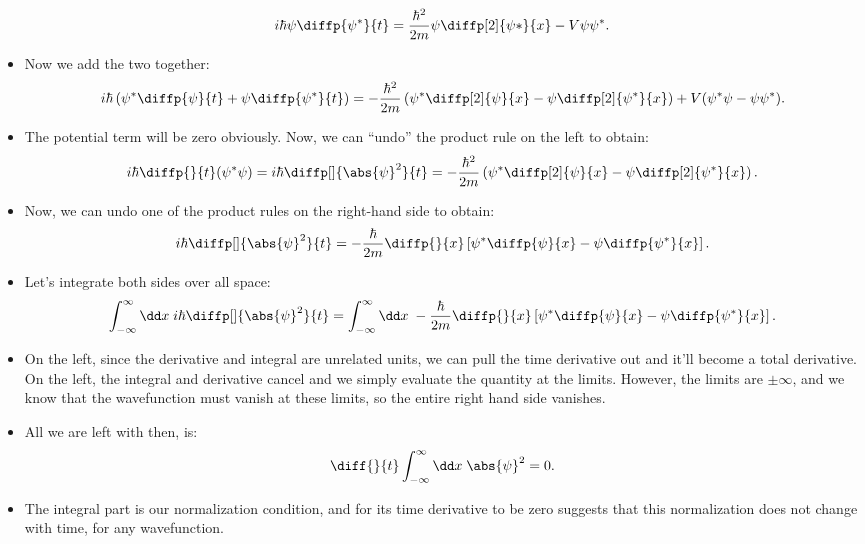 \begin{itemize}
\begin{equation}
            i\hbar \psi \diffp{\psi^*}{t} = \frac{\hbar^2}{2m} \psi\diffp[2]{\psi*}{x} - V\psi\psi^*.
        \end{equation}
    \item Now we add the two together:
        \begin{equation}
            i\hbar \left(\psi^*\diffp{\psi}{t} + \psi\diffp{\psi^*}{t}\right) = -\frac{\hbar^2}{2m} \left(\psi^*\diffp[2]{\psi}{x} - \psi\diffp[2]{\psi^*}{x}\right) + V (\psi^*\psi - \psi\psi^*).
        \end{equation}
    \item The potential term will be zero obviously. Now, we can ``undo'' the product rule on the left to obtain:
        \begin{equation}
            i\hbar \diffp{}{t}(\psi^*\psi) = i\hbar \diffp[]{\abs{\psi}^2}{t} = -\frac{\hbar^2}{2m} \left(\psi^*\diffp[2]{\psi}{x} - \psi\diffp[2]{\psi^*}{x}\right).
        \end{equation}
    \item Now, we can undo one of the product rules on the right-hand side to obtain:
        \begin{equation}
            i\hbar \diffp[]{\abs{\psi}^2}{t} = -\frac{\hbar}{2m} \diffp{}{x} \left[\psi^* \diffp{\psi}{x} - \psi \diffp{\psi^*}{x}\right].
        \end{equation}
    \item Let's integrate both sides over all space:
        \begin{equation}
            \int_{-\infty}^{\infty} \dd x\; i\hbar \diffp[]{\abs{\psi}^2}{t} = \int_{-\infty}^{\infty} \dd x\; -\frac{\hbar}{2m} \diffp{}{x} \left[\psi^* \diffp{\psi}{x} - \psi \diffp{\psi^*}{x}\right].
        \end{equation}
    \item On the left, since the derivative and integral are unrelated units, we can pull the time derivative out and it'll become a total derivative. On the left, the integral and derivative cancel and we simply evaluate the quantity at the limits. However, the limits are $\pm\infty$, and we know that the wavefunction must vanish at these limits, so the entire right hand side vanishes. 
    \item All we are left with then, is:
        \begin{equation}
            \diff{}{t} \int_{-\infty}^{\infty} \dd x\; \abs{\psi}^2 = 0.
        \end{equation}
    \item The integral part is our normalization condition, and for its time derivative to be zero suggests that this normalization does not change with time, for any wavefunction.
\end{itemize}



